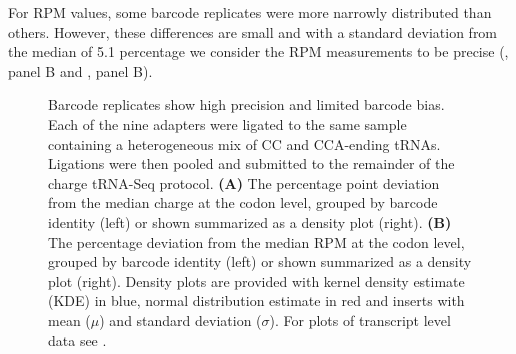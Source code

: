 \documentclass[9pt,lineno]{elife}
\begin{document}
For RPM values, some barcode replicates were more narrowly distributed than others. However, these differences are small and with a standard deviation from the median of 5.1 percentage we consider the RPM measurements to be precise (, panel B and , panel B).

\begin{figure}[ht!]
\centering
{}
\caption{
Barcode replicates show high precision and limited barcode bias.
Each of the nine adapters were ligated to the same sample containing a heterogeneous mix of CC and CCA-ending tRNAs.
Ligations were then pooled and submitted to the remainder of the charge tRNA-Seq protocol.
\textbf{(A)} The percentage point deviation from the median charge at the codon level, grouped by barcode identity (left) or shown summarized as a density plot (right).
\textbf{(B)} The percentage deviation from the median RPM at the codon level, grouped by barcode identity (left) or shown summarized as a density plot (right).
Density plots are provided with kernel density estimate (KDE) in blue, normal distribution estimate in red and inserts with mean ($\mu$) and standard deviation ($\sigma$).
For plots of transcript level data see .
}
\label{fig:Fig4}
\label{figsupp:f4S1}

\end{figure}
\end{document}
